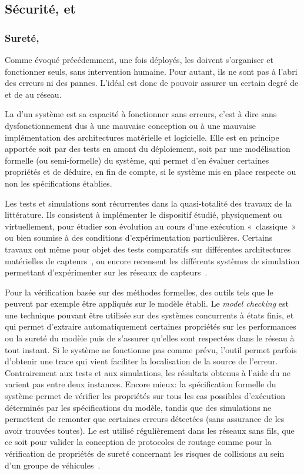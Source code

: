     \subsection{Sécurité,  et \resilience}
        \subsubsection{Sureté, \resilience}
Comme évoqué précédemment, une fois déployés, les \rcs doivent s'organiser et fonctionner seuls, sans intervention humaine.
Pour autant, ils ne sont pas à l'abri des erreurs ni des pannes.
L'idéal est donc de pouvoir assurer un certain degré de  et de \resilience au réseau.

La  d'un système est sa capacité à fonctionner sans erreurs, c'est à dire sans dysfonctionnement dus à une mauvaise conception ou à une mauvaise implémentation des architectures matérielle et logicielle.
Elle est en principe apportée soit par des tests en amont du déploiement, soit par une modélisation formelle (ou semi-formelle) du système, qui permet d'en évaluer certaines propriétés et de déduire, en fin de compte, si le système mis en place respecte ou non les spécifications établies.

Les tests et simulations sont récurrentes dans la quasi-totalité des travaux de la littérature.
Ils consistent à implémenter le dispositif étudié, physiquement ou virtuellement, pour étudier son évolution au cours d'une exécution « classique » ou bien soumise à des conditions d'expérimentation particulières.
Certains travaux ont même pour objet des tests comparatifs sur différentes architectures matérielles de capteurs~\cite{PLP06}, ou encore recensent les différents systèmes de simulation permettant d'expérimenter sur les réseaux de capteurs~\cite{AAAHN12}.

Pour la vérification basée sur des méthodes formelles, des outils tels que le  peuvent par exemple être appliqués sur le modèle établi.
Le \textit{model checking} est une technique pouvant être utilisée sur des systèmes concurrents à états finis, et qui permet d'extraire automatiquement certaines propriétés sur les performances ou la sureté du modèle puis de s'assurer qu'elles sont respectées dans le réseau à tout instant.
Si le système ne fonctionne pas comme prévu, l'outil permet parfois d'obtenir une trace qui vient faciliter la localisation de la source de l'erreur.
Contrairement aux tests et aux simulations, les résultats obtenus à l'aide du  ne varient pas entre deux instances.
Encore mieux: la spécification formelle du système permet de vérifier les propriétés sur tous les cas possibles d'exécution déterminés par les spécifications du modèle, tandis que des simulations ne permettent de remonter que certaines erreurs détectées (sans assurance de les avoir trouvées toutes).
Le \textit{} est utilisé régulièrement dans les réseaux sans fils, que ce soit pour valider la conception de protocoles de routage comme pour la vérification de propriétés de sureté concernant les risques de collisions au sein d'un groupe de véhicules~\cite{E-ZCGGK12}.

